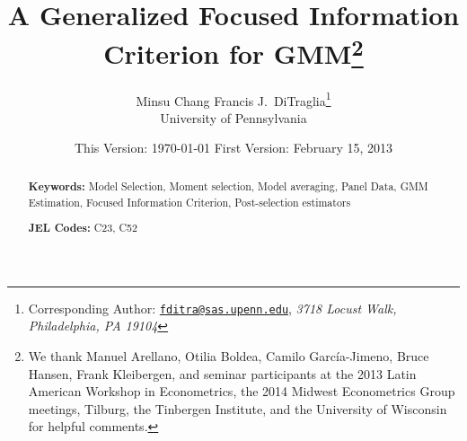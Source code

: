 \documentclass[12pt]{article}
\begin{document}
\title{A Generalized Focused Information Criterion for GMM\footnote{We thank Manuel Arellano, Otilia Boldea, Camilo Garc\'{i}a-Jimeno, Bruce Hansen, Frank Kleibergen, and seminar participants at the 2013 Latin American Workshop in Econometrics, the 2014 Midwest Econometrics Group meetings, Tilburg, the Tinbergen Institute, and the University of Wisconsin for helpful comments.}} 

\author{Minsu Chang \hspace{1em} Francis J.\ DiTraglia\footnote{Corresponding Author:
\href{mailto:fditra@sas.upenn.edu}{\texttt{fditra@sas.upenn.edu}}, \emph{3718 Locust Walk, Philadelphia, PA 19104}}
\\ University of Pennsylvania}

\date{\footnotesize This Version: \today \hspace{0.5em} First Version: February 15, 2013}

\maketitle 
\begin{abstract}
  \singlespacing
	

	\bigskip
	\noindent\textbf{Keywords:} 
  Model Selection, Moment selection, Model averaging, Panel Data, GMM Estimation, Focused Information Criterion, Post-selection estimators

	\medskip
	\noindent\textbf{JEL Codes:} C23, C52 
\end{abstract}










%



\singlespacing
\small



\appendix


\newpage

\end{document}
